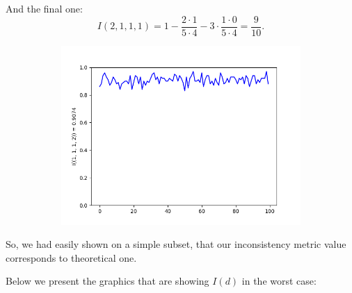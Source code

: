 \documentclass{llncs}
\begin{document}
And the final one:
\[I(2,1,1,1) = 1 - \frac{2 \cdot 1}{5 \cdot 4} - 3\cdot\frac{1 \cdot 0}{5 \cdot 4} = \frac{9}{10} .\]
\begin{figure}
\begin{subfigure}{0.5\linewidth}
\centering\includegraphics[scale=0.4]{images/1-1-1-2-consistent-partitions-probability.png}
\end{subfigure}
\end{figure}

So, we had easily shown on a simple subset, that our inconsistency metric value corresponds to theoretical one.

Below we present the graphics that are showing $I(d)$ in the worst case:
\end{document}
